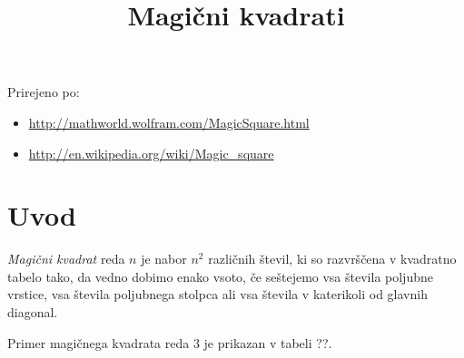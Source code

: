 \documentclass[a4paper,12pt]{article}
\title{Magični kvadrati}
\date{}
\begin{document}
\maketitle

Prirejeno po:

\begin{itemize}
   \item \url{http://mathworld.wolfram.com/MagicSquare.html}
   \item \url{http://en.wikipedia.org/wiki/Magic_square}
\end{itemize}

\renewcommand{\contentsname}{Kazalo}
\tableofcontents

\newpage

\section{Uvod}

   \emph{Magični kvadrat} reda \(n\) je nabor \(n^2\) različnih števil,
   ki so razvrščena v kvadratno tabelo tako, da vedno dobimo enako vsoto,
   če seštejemo vsa števila poljubne vrstice, vsa števila poljubnega
   stolpca ali vsa števila v katerikoli od glavnih diagonal.

Primer magičnega kvadrata reda 3 je prikazan v tabeli ??. %

\end{document}
